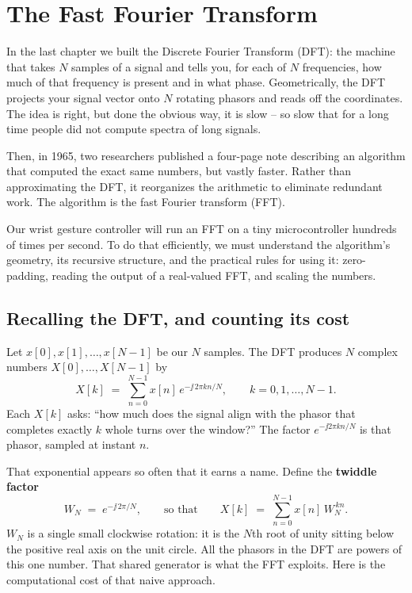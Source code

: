 \chapter{The Fast Fourier Transform}

In the last chapter we built the Discrete Fourier Transform (DFT): the machine that
takes $N$ samples of a signal and tells you, for each of $N$ frequencies, how much of
that frequency is present and in what phase. Geometrically, the DFT projects your
signal vector onto $N$ rotating phasors and reads off the coordinates. The idea is right, but done the obvious way, it is slow -- so slow that for a long time people did not compute spectra of long signals.

Then, in 1965, two researchers published a four-page note describing an algorithm that computed the exact same numbers, but vastly faster. Rather than approximating the DFT, it reorganizes the arithmetic to eliminate redundant work. The algorithm is the fast Fourier transform (FFT).

Our wrist gesture controller will run an FFT on a tiny microcontroller hundreds of times per second. To do that efficiently, we must understand the algorithm's geometry, its recursive structure, and the practical rules for using it: zero-padding, reading the output of a real-valued FFT, and scaling the numbers.

\section{Recalling the DFT, and counting its cost}
\label{ch09:dft-cost}

Let $x[0], x[1], \dots, x[N-1]$ be our $N$ samples. The DFT produces $N$ complex
numbers $X[0], \dots, X[N-1]$ by
\begin{equation}
\label{ch09:dft-defn}
X[k] \;=\; \sum_{n=0}^{N-1} x[n]\, e^{-\jj\, 2\pi k n / N},
\qquad k = 0, 1, \dots, N-1 .
\end{equation}
Each $X[k]$ asks: ``how much does the signal align with the phasor that completes
exactly $k$ whole turns over the window?'' The factor $e^{-\jj 2\pi k n/N}$ is that
phasor, sampled at instant $n$.

That exponential appears so often that it earns a name. Define the \textbf{twiddle
factor}
\begin{equation}
\label{ch09:twiddle}
W_N \;=\; e^{-\jj\, 2\pi / N},
\qquad\text{so that}\qquad
X[k] \;=\; \sum_{n=0}^{N-1} x[n]\, W_N^{\,kn}.
\end{equation}
$W_N$ is a single small clockwise rotation: it is the $N$th root of unity sitting below the positive real axis on the unit circle. All the phasors in the DFT are powers of this one number. That shared generator is what the FFT exploits. Here is the computational cost of that naive approach.

